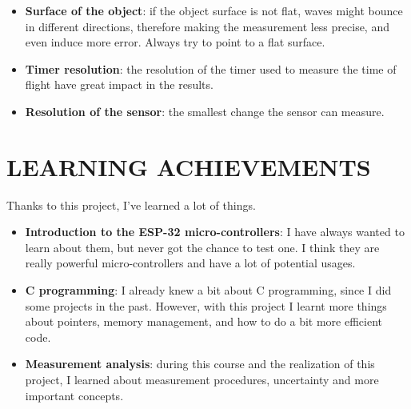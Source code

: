 \documentclass[14pt]{article}
\begin{document}
\begin{normalsize}
\begin{itemize}
			\item \textbf{Surface of the object}: if the object surface is not flat, waves might bounce in different directions, therefore making the measurement less precise, and even induce more error. Always try to point to a flat surface.
			
			\item \textbf{Timer resolution}: the resolution of the timer used to measure the time of flight have great impact in the results.
			
			\item \textbf{Resolution of the sensor}: the smallest change the sensor can measure.
			
		\end{itemize}
	\end{normalsize}
	\section{LEARNING ACHIEVEMENTS}
	\begin{normalsize}
		Thanks to this project, I've learned a lot of things.\\
		\begin{itemize}
			\item \textbf{Introduction to the ESP-32 micro-controllers}: I have always wanted to learn about them, but never got the chance to test one. I think they are really powerful micro-controllers and have a lot of potential usages.
			\item \textbf{C programming}: I already knew a bit about C programming, since I did some projects in the past. However, with this project I learnt more things about pointers, memory management, and how to do a bit more efficient code.
			\item \textbf{Measurement analysis}: during this course and the realization of this project, I learned about measurement procedures, uncertainty and more important concepts.
		\end{itemize}
	\end{normalsize}	
\end{document}
